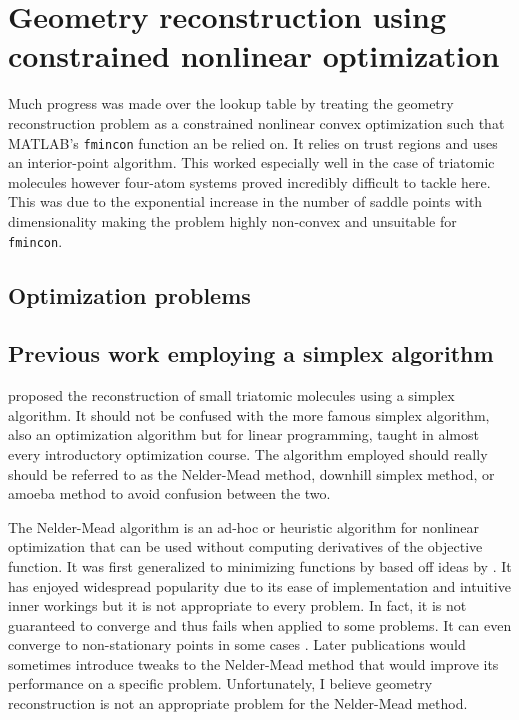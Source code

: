 \chapter{Geometry reconstruction using constrained nonlinear optimization}\label{ch:optimization}

Much progress was made over the lookup table by treating the geometry reconstruction problem as a constrained nonlinear convex optimization such that MATLAB's \texttt{fmincon} function an be relied on. It relies on trust regions and uses an interior-point algorithm. This worked especially well in the case of triatomic molecules however four-atom systems proved incredibly difficult to tackle here. This was due to the exponential increase in the number of saddle points with dimensionality \footnotemark making the problem highly non-convex and unsuitable for \texttt{fmincon}.


\section{Optimization problems}
\section{Previous work employing a simplex algorithm}
\citet{Brichta09} proposed the reconstruction of small triatomic molecules using a simplex algorithm. It should not be confused with the more famous simplex algorithm, also an optimization algorithm but for linear programming, taught in almost every introductory optimization course. The algorithm employed should really should be referred to as the Nelder-Mead method, downhill simplex method, or amoeba method to avoid confusion between the two.\footnotemark


The Nelder-Mead algorithm is an ad-hoc or heuristic algorithm for nonlinear optimization that can be used without computing derivatives of the objective function\footnotemark. It was first generalized to minimizing functions by \citet{Nelder65} based off ideas by \citet{Spendley62}. It has enjoyed widespread popularity due to its ease of implementation and intuitive inner workings but it is not appropriate to every problem. In fact, it is not guaranteed to converge and thus fails when applied to some problems. It can even converge to non-stationary points in some cases \citep{McKinnon98}. Later publications would sometimes introduce tweaks to the Nelder-Mead method that would improve its performance on a specific problem. Unfortunately, I believe geometry reconstruction is not an appropriate problem for the Nelder-Mead method.

